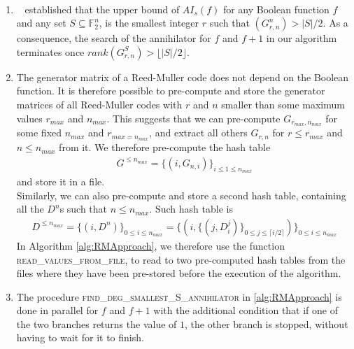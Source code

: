 \documentclass[11pt]{llncs}
\begin{document}
\begin{remark}~\label{rem:remarksOnAlg}
	\begin{enumerate}
		\item ~\cite{TOSC:CarMeaRot17} established that the upper bound of $AI_s(f)$ for any Boolean function $f$ and any set $S\subseteq \mathbb{F}_2^n$, is the smallest integer $r$ such that $\left(G_{r,n}^n\right) > |S| / 2$. As a consequence, the search of the annihilator for $f$ and $f+ 1$ in our algorithm terminates once $rank\left(G_{r,n}^S\right) > \lfloor{|S| / 2}\rfloor$.\label{item:Item1RemOnAlg}
		\item The generator matrix of a Reed-Muller code does not depend on the Boolean function. It is therefore possible to pre-compute and store the generator matrices of all Reed-Muller codes with $r$ and $n$ smaller than some maximum values $r_{max}$ and $n_{max}$.
		This suggests that we can pre-compute $G_{r_{max}, n_{max}}$ for some fixed $n_{max}$ and $r_{max = n_{max}}$, and extract all others $G_{r,n}$ for $r \leq r_{max}$ and $n \leq n_{max}$ from it.
		We therefore pre-compute the hash table
		\begin{align*}
		G^{\leq n_{max}} = \{\left(i, G_{n,i}\right)\}_{i \leq 1 \leq n_{max}}
		\end{align*}
		and store it in a file.\\
		Similarly, we can also pre-compute and store a second hash table, containing all the $D^n$s such that $n \leq n_{max}$. Such hash table is
		\begin{align*}\label{eq:degreesHashTable}
		D^{\leq n_{max}} =  \{\left(i,D^{n} \right)\}_{0 \leq i \leq n_{max}} =  \{\left(i, \{ \left(j, D_i^j\right)\}_{0\leq j \leq \lceil{i/2}\rceil} \right)\}_{0 \leq i \leq n_{max}}
		\end{align*}
		In Algorithm \ref{alg:RMApproach}, we therefore use the function \textsc{read\_values\_from\_file}, to read to two pre-computed hash tables from the files where they have been pre-stored before the execution of the algorithm.
		\item The procedure \textsc{find\_deg\_smallest\_S\_annihilator} in \ref{alg:RMApproach} is done in parallel for $f$ and $f+ 1$ with the additional condition that if one of the two branches returns the value of $1$, the other branch is stopped, without having to wait for it to finish.
	\end{enumerate}	
\end{remark}
\end{document}
